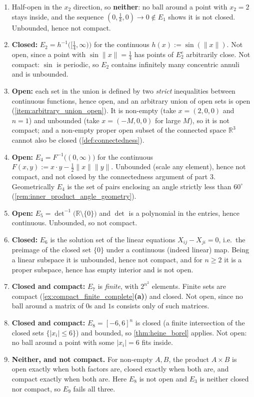 \begin{exercisesolution}
\begin{enumerate}[label=\textbf{\arabic*.}]
  \item Half-open in the $x_2$ direction, so \textbf{neither}: no ball around a point with
    $x_2 = 2$ stays inside, and the sequence $(0,\tfrac1k,0) \to 0 \notin E_1$ shows it is not
    closed. Unbounded, hence not compact.
  \item \textbf{Closed:} $E_2 = h^{-1}\big([\tfrac14,\infty)\big)$ for the continuous
    $h(x) := \sin(\lVert x\rVert)$. Not open, since a point with $\sin\lVert x\rVert = \tfrac14$
    has points of $E_2^c$ arbitrarily close. Not compact: $\sin$ is periodic, so $E_2$ contains
    infinitely many concentric annuli and is unbounded.
  \item \textbf{Open:} each set in the union is defined by two \emph{strict} inequalities between
    continuous functions, hence open, and an arbitrary union of open sets is open
    (\cref{item:arbitrary_union_open}). It is non-empty (take $x = (2,0,0)$ and $n=1$) and
    unbounded (take $x = (-M,0,0)$ for large $M$), so it is not compact; and a non-empty proper
    open subset of the connected space $\mathbb{R}^3$ cannot also be closed
    (\cref{def:connectedness}).
  \item \textbf{Open:} $E_4 = F^{-1}\big((0,\infty)\big)$ for the continuous
    $F(x,y) := x\cdot y - \tfrac12\lVert x\rVert\lVert y\rVert$. Unbounded (scale any element),
    hence not compact, and not closed by the connectedness argument of part 3. Geometrically
    $E_4$ is the set of pairs enclosing an angle strictly less than $60^\circ$
    (\cref{rem:inner_product_angle_geometry}).
  \item \textbf{Open:} $E_5 = \det^{-1}\big(\mathbb{R}\setminus\{0\}\big)$ and $\det$ is a
    polynomial in the entries, hence continuous. Unbounded, so not compact.
  \item \textbf{Closed:} $E_6$ is the solution set of the linear equations $X_{ij} - X_{ji} = 0$,
    i.e.\ the preimage of the closed set $\{0\}$ under a continuous (indeed linear) map. Being a
    linear subspace it is unbounded, hence not compact, and for $n \geq 2$ it is a proper
    subspace, hence has empty interior and is not open.
  \item \textbf{Closed and compact:} $E_7$ is \emph{finite}, with $2^{n^2}$ elements. Finite sets
    are compact (\cref{ex:compact_finite_complete}\textbf{(a)}) and closed. Not open, since no
    ball around a matrix of $0$s and $1$s consists only of such matrices.
  \item \textbf{Closed and compact:} $E_8 = [-6,6]^n$ is closed (a finite intersection of the
    closed sets $\{|x_i| \leq 6\}$) and bounded, so \cref{thm:heine_borel} applies. Not open:
    no ball around a point with some $|x_i| = 6$ fits inside.
  \item \textbf{Neither, and not compact.} For non-empty $A, B$, the product $A \times B$ is open
    exactly when both factors are, closed exactly when both are, and compact exactly when both
    are. Here $E_8$ is not open and $E_3$ is neither closed nor compact, so $E_9$ fails all
    three.


\end{enumerate}
\end{exercisesolution}
